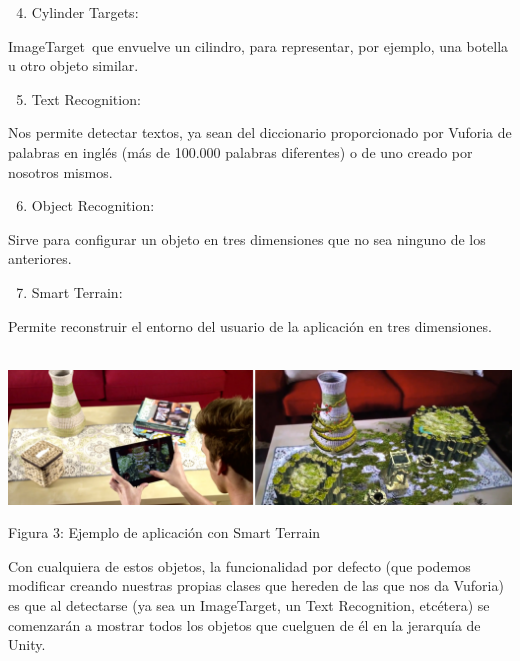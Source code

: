 \documentclass[]{article}
\begin{document}
\begin{enumerate}
\setcounter{enumi}{3}
\itemsep1pt\parskip0pt
\item
  Cylinder Targets:~
\end{enumerate}

ImageTarget~que envuelve un cilindro, para representar, por ejemplo, una
botella u otro objeto similar.

\begin{enumerate}
\setcounter{enumi}{4}
\itemsep1pt\parskip0pt
\item
  Text Recognition:
\end{enumerate}

Nos permite detectar textos, ya sean del diccionario proporcionado por
Vuforia de palabras en inglés (más de 100.000 palabras diferentes) o de
uno creado por nosotros mismos.

\begin{enumerate}
\setcounter{enumi}{5}
\itemsep1pt\parskip0pt
\item
  Object Recognition:
\end{enumerate}

Sirve para configurar un objeto en tres dimensiones que no sea ninguno
de los anteriores.

\begin{enumerate}
\setcounter{enumi}{6}
\itemsep1pt\parskip0pt
\item
  Smart Terrain:
\end{enumerate}

Permite reconstruir el entorno del usuario de la aplicación en tres
dimensiones. ~~~~~~~~~~~~~~~~~ ~~~~~~~~

\includegraphics{images/image13.png}

Figura 3: Ejemplo de aplicación con Smart Terrain

Con cualquiera de estos objetos, la funcionalidad por defecto (que
podemos modificar creando nuestras propias clases que hereden de las que
nos da Vuforia) es que al detectarse (ya sea un ImageTarget, un Text
Recognition, etcétera) se comenzarán a mostrar todos los objetos que
cuelguen de él en la jerarquía de Unity.
\end{document}
